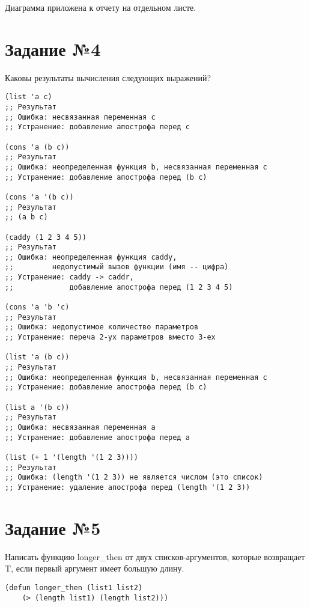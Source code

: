 Диаграмма приложена к отчету на отдельном листе.


\section{Задание №4}

Каковы результаты вычисления следующих выражений?

\vspace{4mm}
\begin{minipage}{0.92\linewidth}
\begin{lstlisting}
(list 'a c)                     
;; Результат
;; Ошибка: несвязанная переменная c
;; Устранение: добавление апострофа перед c

(cons 'a (b c))
;; Результат
;; Ошибка: неопределенная функция b, несвязанная переменная c
;; Устранение: добавление апострофа перед (b c)

(cons 'a '(b c))
;; Результат
;; (a b c)

(caddy (1 2 3 4 5))
;; Результат
;; Ошибка: неопределенная функция caddy,
;;         недопустимый вызов функции (имя -- цифра)
;; Устранение: caddy -> caddr,
;;             добавление апострофа перед (1 2 3 4 5)

(cons 'a 'b 'c)
;; Результат
;; Ошибка: недопустимое количество параметров
;; Устранение: переча 2-ух параметров вместо 3-ех

(list 'a (b c))
;; Результат
;; Ошибка: неопределенная функция b, несвязанная переменная c
;; Устранение: добавление апострофа перед (b c)

(list a '(b c))
;; Результат
;; Ошибка: несвязанная переменная a
;; Устранение: добавление апострофа перед a

(list (+ 1 '(length '(1 2 3))))
;; Результат
;; Ошибка: (length '(1 2 3)) не является числом (это список)
;; Устранение: удаление апострофа перед (length '(1 2 3))
\end{lstlisting}
\end{minipage}

\section{Задание №5}

Написать функцию longer\_then от двух списков-аргументов, которые возвращает T,
если первый аргумент имеет большую длину.

\vspace{4mm}
\begin{minipage}{0.92\linewidth}
\begin{lstlisting}
(defun longer_then (list1 list2)
    (> (length list1) (length list2)))
\end{lstlisting}
\end{minipage}


